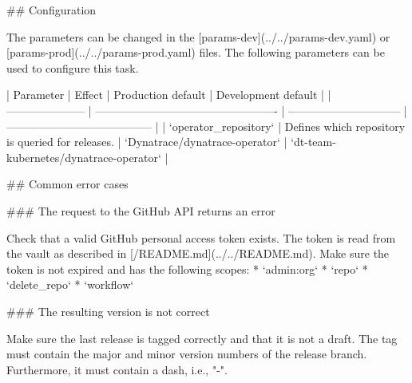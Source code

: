 ## Configuration

The parameters can be changed in the [params-dev](../../params-dev.yaml) or [params-prod](../../params-prod.yaml) files.
The following parameters can be used to configure this task.

| Parameter             | Effect                                            | Production default             | Development default                     |
| --------------------- | ------------------------------------------------- | ------------------------------ | --------------------------------------- |
| `operator_repository` | Defines which repository is queried for releases. | `Dynatrace/dynatrace-operator` | `dt-team-kubernetes/dynatrace-operator` |

## Common error cases

### The request to the GitHub API returns an error

Check that a valid GitHub personal access token exists.
The token is read from the vault as described in [/README.md](../../README.md).
Make sure the token is not expired and has the following scopes:
* `admin:org`
* `repo`
* `delete_repo`
* `workflow`


### The resulting version is not correct

Make sure the last release is tagged correctly and that it is not a draft.
The tag must contain the major and minor version numbers of the release branch.
Furthermore, it must contain a dash, i.e., "-".